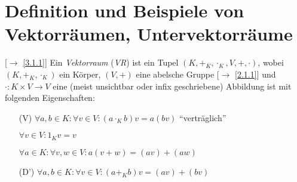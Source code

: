 \documentclass[../../main.tex]{subfiles}
\begin{document}
\section{Definition und Beispiele von Vektorräumen, Untervektorräume}

\begin{df}\mbox{}\label{6.1.1}
[$\to$ \ref{3.1.1}] Ein \emph{Vektorraum} (\emph{VR}) ist ein Tupel $(K,+_K,\cdot_K, V,+,\cdot)$, wobei $(K,+_K,\cdot_K)$ ein Körper, $(V,+)$ eine abelsche Gruppe [$\to$ \ref{2.1.1}] und $\cdot:K\times V\to V$ eine (meist unsichtbar oder infix geschriebene) Abbildung ist mit folgenden Eigenschaften:
\begin{itemize}
\item[(V)] $\forall a,b\in K:\forall v\in V:(a\cdot_K b)v = a(bv)$ \qquad"`verträglich"'
\item[\vecN] $\forall v\in V: 1_Kv = v$
\item[\vecD] $\forall a\in K: \forall v,w\in V: a(v+w) = (av)+(aw)$
\item[(D')] $\forall a,b\in K:\forall v\in V: (a+_Kb)v = (av) + (bv)$
\end{itemize}
\end{df}
\end{document}
